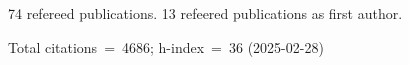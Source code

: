 74 refereed publications. 13 refeered publications as first author.

Total citations~=~4686; h-index~=~36 (2025-02-28)